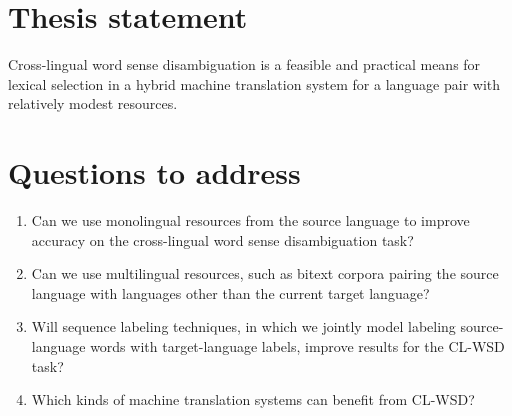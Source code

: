 
\section{Thesis statement}
Cross-lingual word sense disambiguation is a feasible and practical
means for lexical selection in a hybrid machine translation system for a
language pair with relatively modest resources.

\section{Questions to address}
\begin{enumerate}
\item Can we use monolingual resources from the source language to improve
accuracy on the cross-lingual word sense disambiguation task?
\item Can we use multilingual resources, such as bitext corpora pairing the
source language with languages other than the current target language?
\item Will sequence labeling techniques, in which we jointly model labeling
source-language words with target-language labels, improve results for the
CL-WSD task?
\item Which kinds of machine translation systems can benefit from CL-WSD?
\end{enumerate}
